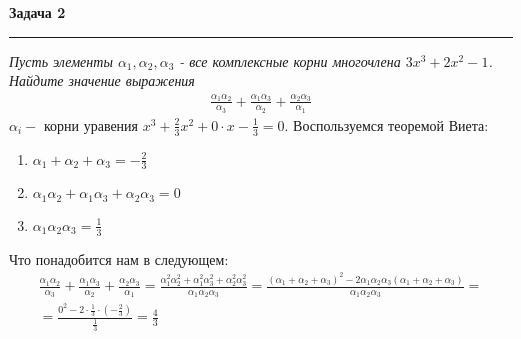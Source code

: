 \documentclass[a4paper,11pt]{article}
\begin{document}
\textbf{\large Задача 2}
\medskip\hrule\medskip
\textit{Пусть элементы $ \alpha_1, \alpha_2, \alpha_3 $ - все комплексные корни многочлена $ 3x^3 + 2x^2 - 1 $. Найдите значение выражения }
\begin{gather*}
	\frac{\alpha_1\alpha_2}{\alpha_3} + \frac{\alpha_1\alpha_3}{\alpha_2} + \frac{\alpha_2\alpha_3}{\alpha_1}
\end{gather*}
$ \alpha_{i} - $ корни уравения $ x^3 + \frac23x^2 + 0 \cdot x - \frac13 = 0 $.
Воспользуемся теоремой Виета: 
\begin{enumerate}
	\item $ \alpha_1 + \alpha_2 + \alpha_3 = -\frac23 $
	\item $ \alpha_1\alpha_2 + \alpha_1\alpha_3 + \alpha_2\alpha_3 = 0 $
	\item $ \alpha_1\alpha_2\alpha_3 = \frac13 $
\end{enumerate} 
Что понадобится нам в следующем:
\begin{gather*}
\frac{\alpha_1\alpha_2}{\alpha_3} + \frac{\alpha_1\alpha_3}{\alpha_2} + \frac{\alpha_2\alpha_3}{\alpha_1} = 
\frac{\alpha_1^2\alpha_2^2 + \alpha_1^2\alpha_3^2 + \alpha_2^2\alpha_3^2}{\alpha_1\alpha_2\alpha_3} = 
\frac{(\alpha_1 + \alpha_2 + \alpha_3)^2 - 2\alpha_1\alpha_2\alpha_3(\alpha_1 + \alpha_2 + \alpha_3)}{\alpha_1\alpha_2\alpha_3} = \\[2pt] = 
\frac{0^2 - 2 \cdot \frac13 \cdot (-\frac23) }{\frac13} = \frac43
\end{gather*}
\newpage




\end{document}

